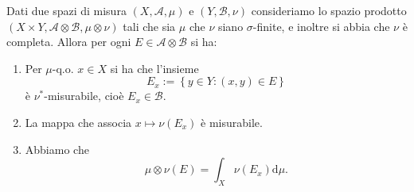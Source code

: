 \documentclass[11pt]{scrartcl}
\newcommand{\dif}{\text{d}}
\begin{document}
	\begin{lemma}
		Dati due spazi di misura $(X,\mathcal{A},\mu)$ e $\left(Y,\mathcal{B},\nu\right)$ consideriamo lo spazio prodotto $(X\times Y, \mathcal{A}\otimes \mathcal{B},\mu \otimes \nu)$ tali che sia $\mu$ che $\nu$ siano $\sigma$-finite, e inoltre si abbia che $\nu$ è completa. Allora per ogni $E\in \mathcal{A}\otimes \mathcal{B}$ si ha:
		\begin{enumerate}
			\item Per $\mu$-q.o. $x\in X$ si ha che l'insieme 
			$$E_x:=\left\{y\in Y:(x,y)\in E\right\}$$
			è $\nu^*$-misurabile, cioè $E_x\in \mathcal{B}$.
			\item La mappa che associa $x\mapsto \nu(E_x)$ è misurabile.
			\item Abbiamo che
			$$\mu\otimes \nu \left(E\right)=\int_X \nu(E_x)\dif \mu.$$
		\end{enumerate}
	\end{lemma}
\end{document}
